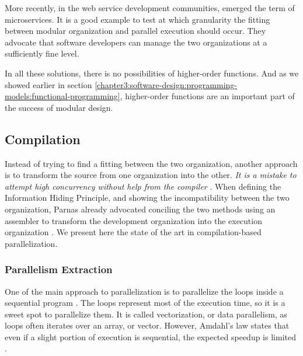 More recently, in the web service development communities, emerged the term of microservices.
It is a good example to test at which granularity the fitting between modular organization and parallel execution should occur.
They advocate that software developers can manage the two organizations at a sufficiently fine level.

In all these solutions, there is no possibilities of higher-order functions.
And as we showed earlier in section \ref{chapter3:software-design:programming-models:functional-programming}, higher-order functions are an important part of the success of modular design.

\subsection{Compilation}


Instead of trying to find a fitting between the two organization, another approach is to transform the source from one organization into the other.
\textit{It is a mistake to attempt high concurrency without help from the compiler} \cite{Behren2003}.
When defining the Information Hiding Principle, and showing the incompatibility between the two organization, Parnas already advocated conciling the two methods using an assembler to transform the development organization into the execution organization \cite{Parnas1972}.
We present here the state of the art in compilation-based parallelization.


\subsubsection{Parallelism Extraction}


One of the main approach to parallelization is to parallelize the loops inside a sequential program \cite{Amarasinghe1995,Banerjee2013,Radoi2014}.
The loops represent most of the execution time, so it is a sweet spot to parallelize them.
It is called vectorization, or data parallelism, as loops often iterates over an array, or vector.
However, Amdahl's law states that even if a slight portion of execution is sequential, the expected speedup is limited \cite{Amdahl1967,Clements2013a}.

